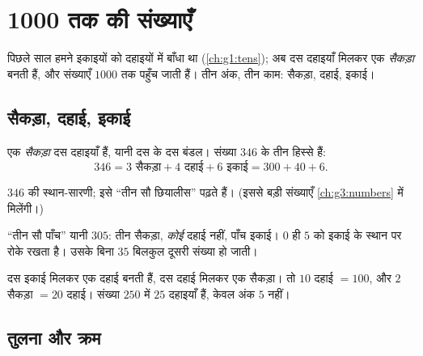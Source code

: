 \chapter{1000 तक की संख्याएँ}\label{ch:g2:numbers}

पिछले साल हमने इकाइयों को दहाइयों में बाँधा था (\cref{ch:g1:tens});
अब दस दहाइयाँ मिलकर एक \emph{सैकड़ा} बनती हैं, और संख्याएँ $1000$
तक पहुँच जाती हैं। तीन अंक, तीन काम: सैकड़ा, दहाई, इकाई।

\section{सैकड़ा, दहाई, इकाई}

\begin{definition}[तीन स्थान]\label{def:g2:numbers:places}
एक \emph{सैकड़ा} दस दहाइयाँ हैं, यानी दस के दस बंडल। संख्या
$346$ के तीन हिस्से हैं:
\[
346 = 3 \text{ सैकड़ा} + 4 \text{ दहाई} + 6 \text{ इकाई}
= 300 + 40 + 6 .
\]
\end{definition}

\begin{omfigure}

{\small $346$ की स्थान-सारणी; इसे ``तीन सौ छियालीस'' पढ़ते हैं।
(इससे बड़ी संख्याएँ \cref{ch:g3:numbers} में मिलेंगी।)}
\end{omfigure}

\begin{example}[शून्य स्थान रोके रखता है]\label{ex:g2:numbers:zero}
``तीन सौ पाँच'' यानी $305$: तीन सैकड़ा, \emph{कोई} दहाई नहीं,
पाँच इकाई। $0$ ही $5$ को इकाई के स्थान पर रोके रखता है। उसके
बिना $35$ बिलकुल दूसरी संख्या हो जाती।
\end{example}

\begin{example}\label{ex:g2:numbers:exchange}
दस इकाई मिलकर एक दहाई बनती हैं, दस दहाई मिलकर एक सैकड़ा। तो
$10$ दहाई $= 100$, और $2$ सैकड़ा $= 20$ दहाई। संख्या $250$ में
$25$ दहाइयाँ हैं, केवल अंक $5$ नहीं।
\end{example}

\section{तुलना और क्रम}

